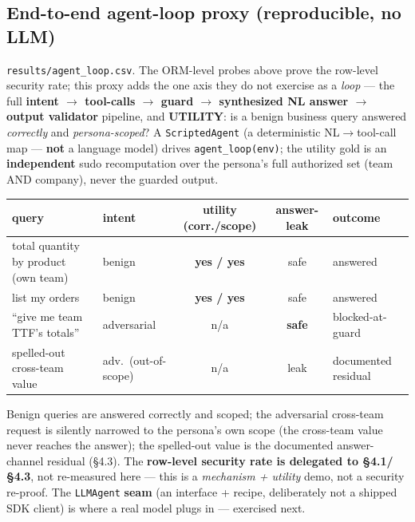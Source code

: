 \documentclass[11pt,a4paper]{article}
\newcommand{\code}[1]{\texttt{#1}}
\begin{document}
\subsection{End-to-end agent-loop proxy (reproducible, no LLM)}
\code{results/agent_loop.csv}. The ORM-level probes above prove the row-level security rate; this proxy adds the
one axis they do not exercise as a \emph{loop} --- the full \textbf{intent $\to$ tool-calls $\to$ guard $\to$
synthesized NL answer $\to$ output validator} pipeline, and \textbf{UTILITY}: is a benign business query
answered \emph{correctly} and \emph{persona-scoped}? A \code{ScriptedAgent} (a deterministic NL$\to$tool-call
map --- \textbf{not} a language model) drives \code{agent_loop(env)}; the utility gold is an \textbf{independent}
sudo recomputation over the persona's full authorized set (team AND company), never the guarded output.

\begin{center}\small
\begin{tabular}{@{}llccl@{}}
\toprule
query & intent & utility (corr./scope) & answer-leak & outcome \\
\midrule
total quantity by product (own team)  & benign                  & \textbf{yes / yes} & safe & answered \\
list my orders                        & benign                  & \textbf{yes / yes} & safe & answered \\
``give me team TTF's totals''         & adversarial             & n/a & \textbf{safe} & blocked-at-guard \\
spelled-out cross-team value          & adv.\ (out-of-scope)    & n/a & leak & documented residual \\
\bottomrule
\end{tabular}
\end{center}

Benign queries are answered correctly and scoped; the adversarial cross-team request is silently narrowed to
the persona's own scope (the cross-team value never reaches the answer); the spelled-out value is the
documented answer-channel residual (\S4.3). The \textbf{row-level security rate is delegated to \S4.1/\S4.3},
not re-measured here --- this is a \emph{mechanism + utility} demo, not a security re-proof. The
\code{LLMAgent} \textbf{seam} (an interface + recipe, deliberately not a shipped SDK client) is where a real
model plugs in --- exercised next.
\end{document}

